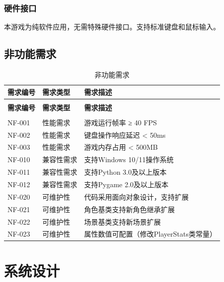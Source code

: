 \documentclass[12pt,a4paper]{article}
\begin{document}
\subsubsection{硬件接口}

本游戏为纯软件应用，无需特殊硬件接口。支持标准键盘和鼠标输入。

\subsection{非功能需求}

\begin{longtable}{>{\centering\arraybackslash}m{2cm}>{\centering\arraybackslash}m{3cm}>{\centering\arraybackslash}m{5cm}}
\caption{非功能需求} \label{tab:nfr} \\
\toprule
\textbf{需求编号} & \textbf{需求类型} & \textbf{需求描述} \\
\midrule
\endfirsthead

\toprule
\multicolumn{3}{l}{续表} \\
\textbf{需求编号} & \textbf{需求类型} & \textbf{需求描述} \\
\midrule
\endhead

\midrule
\multicolumn{3}{r}{续下页} \\
\endfoot

\bottomrule
\endlastfoot

NF-001 & 性能需求 & 游戏运行帧率 ≥ 40 FPS \\
NF-002 & 性能需求 & 键盘操作响应延迟 < 50ms \\
NF-003 & 性能需求 & 游戏内存占用 < 500MB \\
NF-010 & 兼容性需求 & 支持Windows 10/11操作系统 \\
NF-011 & 兼容性需求 & 支持Python 3.0及以上版本 \\
NF-012 & 兼容性需求 & 支持Pygame 2.0及以上版本 \\
NF-020 & 可维护性 & 代码采用面向对象设计，支持扩展 \\
NF-021 & 可维护性 & 角色基类支持新角色继承扩展 \\
NF-022 & 可维护性 & 场景基类支持新场景扩展 \\
NF-023 & 可维护性 & 属性数值可配置（修改PlayerStats类常量） \\
\end{longtable}

\section{系统设计}
\end{document}
